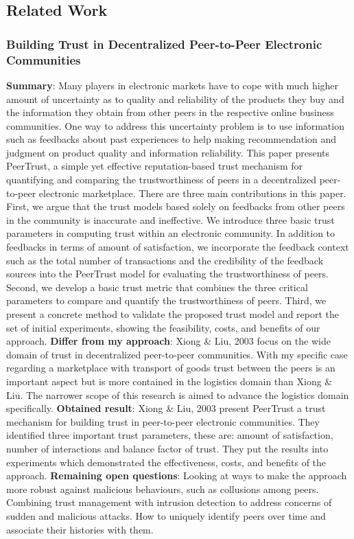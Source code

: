 \subsection{Related Work}

\subsubsection{Building Trust in Decentralized Peer-to-Peer Electronic Communities \cite{buildTrust}}
\textbf{Summary}: Many players in electronic markets have to cope with much higher amount of uncertainty as to quality and reliability of the products they buy and the information they obtain from other peers in the respective online business communities. One way to address this uncertainty problem is to use information such as feedbacks about past experiences to help making recommendation and judgment on product quality and information reliability. This paper presents PeerTrust, a simple yet effective reputation-based trust mechanism for quantifying and comparing the trustworthiness of peers in a decentralized peer-to-peer electronic marketplace. There are three main contributions in this paper. First, we argue that the trust models based solely on feedbacks from other peers in the community is inaccurate and ineffective. We introduce three basic trust parameters in computing trust within an electronic community. In addition to feedbacks in terms of amount of satisfaction, we incorporate the feedback context such as the total number of transactions and the credibility of the feedback sources into the PeerTrust model for evaluating the trustworthiness of peers. Second, we develop a basic trust metric that combines the three critical parameters to compare and quantify the trustworthiness of peers. Third, we present a concrete method to validate the proposed trust model and report the set of initial experiments, showing the feasibility, costs, and benefits of our approach.\newline
\textbf{Differ from my approach}: Xiong \& Liu, 2003 focus on the wide domain of trust in decentralized peer-to-peer communities. With my specific case regarding a marketplace with transport of goods trust between the peers is an important aspect but is more contained in the logistics domain than Xiong \& Liu. The narrower scope of this research is aimed to advance the logistics domain specifically. \newline
\textbf{Obtained result}: Xiong \& Liu, 2003 present PeerTrust a trust mechanism for building trust in peer-to-peer electronic communities. They identified three important trust parameters, these are: amount of satisfaction, number of interactions and balance factor of trust. They put the results into experiments which demonstrated the effectiveness, costs, and benefits of the approach.\newline
\textbf{Remaining open questions}: Looking at ways to make the approach more robust against malicious behaviours, such as collusions among peers. Combining trust management with intrusion detection to address concerns of sudden and malicious attacks. How to uniquely identify peers over time and associate their histories with them.\newline

